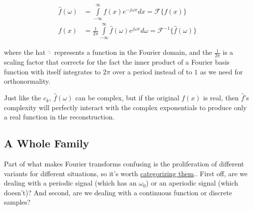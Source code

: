 \documentclass[10pt]{article}
\begin{document}
\begin{equation}\label{pair}
\begin{aligned}
\hat{f}(\omega) &= \int\limits_{-\infty}^{\infty} f(x) e^{-j \omega x} dx = \mathcal{F}\{f(x)\} \\
f(x) &= \frac{1}{2\pi} \int\limits_{-\infty}^{\infty} \hat{f}(\omega) e^{j \omega x} d \omega = \mathcal{F}^{-1}\{\hat{f}(\omega)\}
\end{aligned}
\end{equation}


where the hat $\hat{\cdot}$ represents a function in the Fourier domain, and the $\frac{1}{2\pi}$ is a scaling factor that corrects for the fact the inner product of a Fourier basis function with itself integrates to $2\pi$ over a period instead of to $1$ as we need for orthonormality.

Just like the $c_k$, $\hat{f}(\omega)$ can be complex, but if the original $f(x)$ is real, then $\hat{f}$'s complexity will perfectly interact with the complex exponentials to produce only a real function in the reconstruction. 

\subsection{A Whole Family}\label{family}

Part of what makes Fourier transforms confusing is the proliferation of different variants for different situations, so it's worth \href{https://medium.com/sho-jp/fourier-transform-101-part-4-discrete-fourier-transform-8fc3fbb763f3 }{categorizing them}.\cite{medium}. First off, are we dealing with a periodic signal (which has an $\omega_0$) or an aperiodic signal (which doesn't)? And second, are we dealing with a continuous function or discrete samples?
\end{document}
